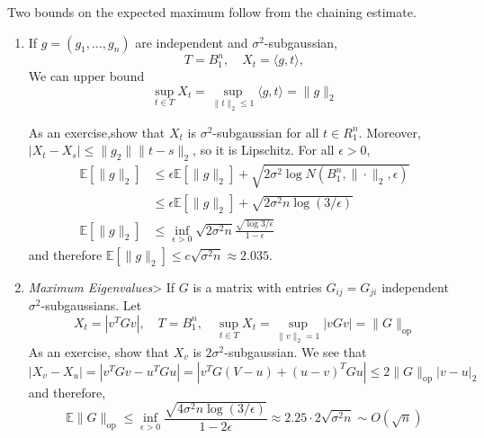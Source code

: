 \begin{example}
  \label{ex:maxima-of-subgaussian-vectors-and-eigenvalues}
  Two bounds on the expected maximum follow from the chaining estimate. 
	\begin{enumerate}
	  \item If $g = (g_1, \ldots, g_n)$ are independent and $\sigma^2$-subgaussian, 
			\begin{equation}
				T = B_1^n, \quad X_t = \langle g, t \rangle,
			\end{equation}
			We can upper bound 
			\begin{equation}
				\sup_{t \in T} X_t = \sup_{\|t\|_2 \leq 1} \langle g, t \rangle = \|g\|_2 
			\end{equation}

			As an exercise,show that $X_t$ is $\sigma^2$-subgaussian for all $t \in R_1^n$. Moreover, $|X_t - X_s| \leq \|g_2\| \|t - s\|_2$, so it is Lipschitz. For all $\epsilon > 0$, 
			\begin{align}
				\mathbb{E}[\|g\|_2] & \leq \epsilon \mathbb{E}[\|g\|_2] + \sqrt{2 \sigma^2 \log{N(B_1^n , \|\cdot\|_2, \epsilon)}} \\ 
														& \leq \epsilon \mathbb{E}[\|g\|_2] + \sqrt{2 \sigma^2 n \log(3/\epsilon)} \\ 
				\mathbb{E}[\|g\|_2] & \leq \inf_{\epsilon > 0} \sqrt{2 \sigma^2 n} \frac{\sqrt{\log{3/\epsilon}}}{1 - \epsilon} 
			\end{align}
			and therefore $\mathbb{E}[\|g\|_2] \leq c \sqrt{\sigma^2 n} \approx 2.035$. 

		\item \textit{Maximum Eigenvalues}> If $G$ is a matrix with entries $G_{ij} = G_{ji}$ independent $\sigma^2$-subgaussians. Let 
			\begin{equation}
				X_t = |v^T G v|, \quad T = B_1^n, \quad \sup_{t \in T} X_t = \sup_{\|v\|_2 = 1} | v G v| = \|G\|_{\mathrm{op}}
			\end{equation}
			As an exercise, show that $X_v$ is $2\sigma^2$-subgaussian. We see that 
			\begin{equation}
				|X_v - X_u| = |v^T G v - u^T G u| = | v^T G(V - u) + (u - v)^T G u| \leq 2 \|G\|_{\mathrm{op}} |v - u|_2
			\end{equation}
			and therefore, 
			\begin{equation}
				\mathbb{E}{\|G\|_{\mathrm{op}}} \leq \inf_{\epsilon > 0} \frac{\sqrt{4 \sigma^2 n \log (3/\epsilon)}}{1 - 2 \epsilon} \approx 2.25 \cdot 2 \sqrt{\sigma^2 n} \sim O(\sqrt{n})
			\end{equation}
	\end{enumerate}
\end{example}

